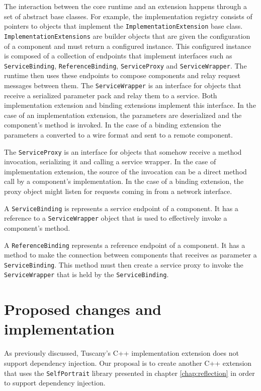 The interaction between the core runtime and an extension happens through a set of abstract base classes. For example, the
implementation registry consists of pointers to objects that implement the \texttt{ImplementationExtension} base class.
\texttt{ImplementationExtensions} are builder objects that are given the configuration of a component and must return a
configured instance. This configured instance is composed of a collection of endpoints that implement interfaces such as
\texttt{ServiceBinding}, \texttt{ReferenceBinding}, \texttt{ServiceProxy} and \texttt{ServiceWrapper}. The runtime
then uses these endpoints to compose components and relay request messages between them.
The \texttt{ServiceWrapper} is an interface for objects that receive a serialized parameter pack and relay them
to a service. Both implementation extension and binding extensions implement this interface. In the case of an
implementation extension, the parameters are deserialized and the component's method is invoked. In the case
of a binding extension the parameters a converted to a wire format and sent to a remote component. 

The \texttt{ServiceProxy} is an interface for objects that somehow receive a method invocation, serializing it and
calling a service wrapper. In the case of implementation extension, the source of the invocation can be a direct method
call by a component's implementation. In the case of a binding extension, the proxy object might listen for requests coming
in from a network interface.

A \texttt{ServiceBinding} is represents a service endpoint of a component. It has a reference to a \texttt{ServiceWrapper}
object that is used to effectively invoke a component's method.

A \texttt{ReferenceBinding} represents a reference endpoint of a component. It has a method to make the connection
between components that receives as parameter a \texttt{ServiceBinding}. This method must then create a service proxy
to invoke the \texttt{ServiceWrapper} that is held by the \texttt{ServiceBinding}.

\section{Proposed changes and implementation}

As previously discussed, Tuscany's C++ implementation extension does not support dependency injection. Our proposal is to
create another C++ extension that uses the \texttt{SelfPortrait} library presented in chapter \ref{chap:reflection} in order
to support dependency injection. 

